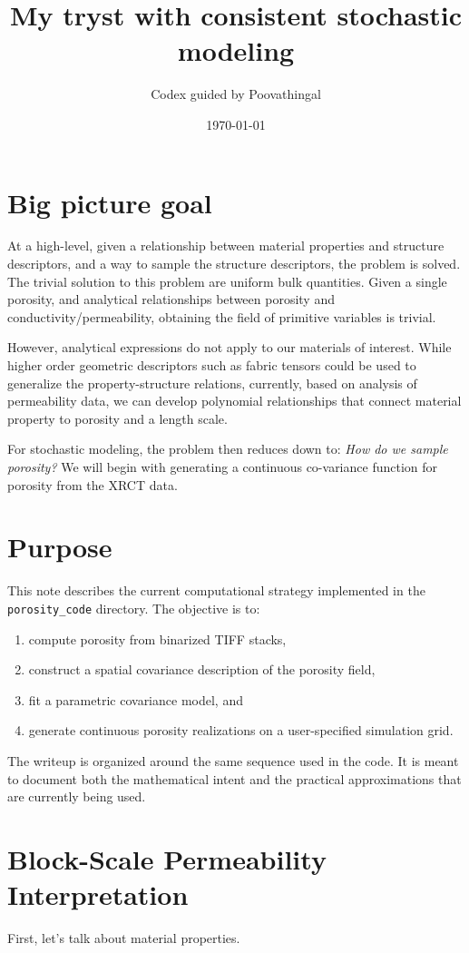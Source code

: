 \documentclass[11pt]{article}
\title{My tryst with consistent stochastic modeling}
\author{Codex guided by Poovathingal}
\date{\today}
\begin{document}
\maketitle

\section{Big picture goal}
At a high-level, given a relationship between material properties and structure descriptors, and a way to sample the
structure descriptors, the problem is solved. The trivial solution to this problem are uniform bulk quantities. Given a single porosity, 
and analytical relationships between porosity and conductivity/permeability, obtaining the field of primitive variables is trivial. 


However, analytical expressions do not apply to our materials of interest. While higher order geometric descriptors such as fabric tensors could be used to generalize the 
property-structure relations, currently, based on analysis of permeability data, we can develop polynomial relationships that connect material property to porosity and a length scale. 

For stochastic modeling, the problem then reduces down to: {\it How do we sample porosity?} We will begin with generating a continuous co-variance function for porosity from the XRCT data. 

\section{Purpose}
This note describes the current computational strategy implemented in the
\texttt{porosity\_code} directory. The objective is to:
\begin{enumerate}[label=\arabic*.]
\item compute porosity from binarized TIFF stacks,
\item construct a spatial covariance description of the porosity field,
\item fit a parametric covariance model, and
\item generate continuous porosity realizations on a user-specified simulation grid.
\end{enumerate}

The writeup is organized around the same sequence used in the code. It is meant
to document both the mathematical intent and the practical approximations that
are currently being used.

\section{Block-Scale Permeability Interpretation}
First, let's talk about material properties. 
\end{document}
